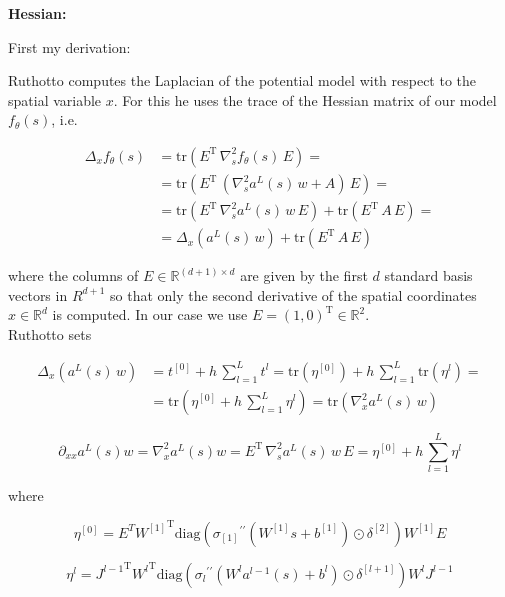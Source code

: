 \textbf{Hessian:}

First my derivation:

Ruthotto computes the Laplacian of the potential model with respect to the spatial variable $x$. For this he uses the trace of the Hessian matrix of our model $f_{\theta}(s)$, i.e. 

\begin{align*}
    \Delta_x f_{\theta}(s) & = \mathrm{tr}(E^{\mathrm{T}} \, \nabla^{2}_s f_{\theta}(s) \, E) = \\
    & = \mathrm{tr}(E^{\mathrm{T}} \, (\nabla^{2}_s a^{L}(s) \, w + A) \, E) = \\
    & = \mathrm{tr}(E^{\mathrm{T}} \, \nabla^{2}_s a^{L}(s) \, w \, E) + \mathrm{tr}(E^{\mathrm{T}} \,  A \, E) = \\
    & = \Delta_x (a^{L}(s) \, w) + \mathrm{tr}(E^{\mathrm{T}} \,  A \, E)
\end{align*}

where the columns of $E \in \mathbb{R}^{(d+1) \times d}$ are given by the first $d$ standard basis vectors in $R^{d+1}$ so that only the second derivative of the spatial coordinates $x \in \mathbb{R}^d$ is computed. In our case we use $E = (1, 0)^{\mathrm{T}} \in \mathbb{R}^{2}$. \\
Ruthotto sets

\begin{align*}
    \Delta_x (a^{L}(s) \, w) & = t^{[0]} + h \, \sum^{L}_{l=1} t^{l} = \mathrm{tr}(\eta^{[0]}) + h \, \sum^{L}_{l=1} \mathrm{tr}(\eta^{l}) = \\
    & = \mathrm{tr} \left( \eta^{[0]} + h \, \sum^{L}_{l=1} \eta^{l} \right) = \mathrm{tr} \left( \nabla^{2}_x a^{L}(s) \, w \right)
\end{align*}

\begin{equation*}
    \partial_{xx} a^{L}(s) w = \nabla^{2}_x a^{L}(s) w = E^{\mathrm{T}} \, \nabla^{2}_s a^{L}(s) \, w \, E = \eta^{[0]} + h \, \sum^{L}_{l=1} \eta^{l}
\end{equation*}

where 

\begin{equation*}
    \eta^{[0]} = E^T {W^{[1]}}^{\mathrm{T}} \mathrm{diag}({\sigma_{[1]}}^{\prime \prime}(W^{[1]} s + b^{[1]}) \odot \delta^{[2]}) W^{[1]} E
\end{equation*}

\begin{equation*}
    \eta^{l} = {J^{l-1}}^{\mathrm{T}} {W^{l}}^{\mathrm{T}} \mathrm{diag}({\sigma_{l}}^{\prime \prime}(W^{l} a^{l-1}(s) + b^{l}) \odot \delta^{[l+1]}) W^{l} J^{l-1}
\end{equation*}

